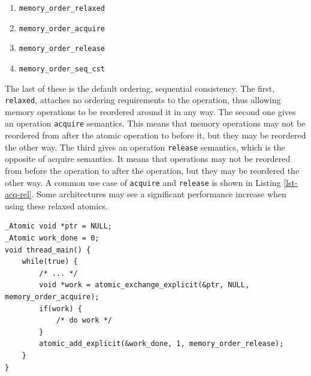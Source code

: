 \documentclass[12pt]{article}
\begin{document}
\singlespacing
\begin{enumerate}
	\item \texttt{memory\_order\_relaxed}
	\item \texttt{memory\_order\_acquire}
	\item \texttt{memory\_order\_release}
	\item \texttt{memory\_order\_seq\_cst}\\
\end{enumerate}
\doublespacing
The last of these is the default ordering, sequential consistency. The first, \texttt{relaxed}, attaches no ordering
requirements to the operation, thus allowing memory operations to be reordered around it in any way. The second
one gives an operation \texttt{acquire} semantics. This means that memory operations may not be reordered from after the
atomic operation to before it, but they may be reordered the other way. The third gives an operation \texttt{release} semantics,
which is the opposite of acquire semantics. It means that operations may not be reordered from before the operation to
after the operation, but they may be reordered the other way. A common use case of \texttt{acquire} and \texttt{release} is shown in Listing \ref{lst-acq-rel}.
Some architectures may see a significant performance increase when using these relaxed atomics.


\begin{minipage}{\linewidth}
\onehalfspacing
	\begin{lstlisting}[label={lst-acq-rel}, caption={[Example of relaxing atomics.]\doublespacing Example of relaxing atomics. Say some other thread sets the \texttt{ptr} variable to some work to be
done. Only one thread would do this work, because of the atomic exchange of the pointer. Additionally, any memory accesses between the exchange
and the add would not be able to move out before or after those instructions. However, any memory accesses made before the exchange or after the add
would be able to move inside that block of code.}]
_Atomic void *ptr = NULL;
_Atomic work_done = 0;
void thread_main() {
	while(true) {
		/* ... */
		void *work = atomic_exchange_explicit(&ptr, NULL, memory_order_acquire);
		if(work) {
			/* do work */
		}
		atomic_add_explicit(&work_done, 1, memory_order_release);
	}
}
\end{lstlisting}
\doublespacing
\end{minipage}
\end{document}
